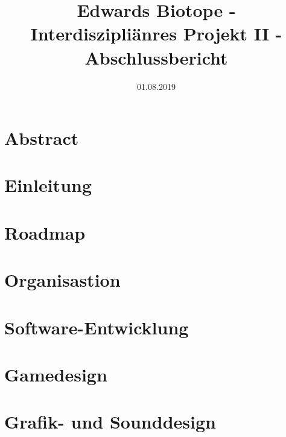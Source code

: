 \documentclass[12pt ,letterpaper]{article}
\title{Edwards Biotope - Interdiszipliänres Projekt II - Abschlussbericht}
\date{01.08.2019}
\begin{document}
\begin{onehalfspace}
\maketitle
\tableofcontents
\pagebreak
\section{Abstract}
\section{Einleitung}
\pagebreak
\section{Roadmap}

\pagebreak
\section{Organisastion}

\section{Software-Entwicklung}



\section{Gamedesign}

\section{Grafik- und Sounddesign} 


\pagebreak

\pagebreak


\listoffigures
\end{onehalfspace}
\end{document}
